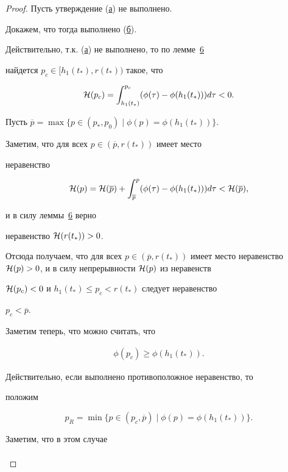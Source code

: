 \begin{proof} Пусть утверждение (\hyperlink{7a}{а}) не выполнено. 

Докажем, что тогда выполнено (\hyperlink{7b}{б}). 

Действительно, т.к. (\hyperlink{7a}{а}) не выполнено, то по лемме~\hyperlink{palin:lemma6}{6}

 найдется $p_c\in[h_1(t_*),r(t_*))$ такое, что

$$

{\cal H}(p_c)=\int _{h_1(t_*)}^{p_c}(\phi(\tau)-\phi(h_1(t_*)))d\tau<0.

$$



Пусть $\overline{p}=\max\{p\in(p_*,p_0)\mid\phi(p)=\phi(h_1(t_*))\}$.

Заметим, что для всех $p\in(\overline{p},r(t_*))$ имеет место

неравенство

$$

{\cal H}(p)={\cal

H}(\overline{p})+\int _{\overline{p}}^p(\phi(\tau)-\phi(h_1(t_*)))d\tau<{\cal

H}(\overline{p}),

$$

и в силу леммы~\hyperlink{palin:lemma6}{6} верно

неравенство ${\cal H}(r(t_*))>0$. 

Отсюда получаем, что для всех $p\in(\overline{p},r(t_*))$ имеет место неравенство ${\cal H}(p)>0$, и в силу непрерывности ${\cal H}(p)$ из неравенств

${\cal H}(p_c)<0$ и $h_1(t_*)\le p_c<r(t_*)$ следует неравенство

$p_c<\overline{p}$.



Заметим теперь, что можно считать, что

\begin{gather}

\phi(p_c)\ge\phi(h_1(t_*)).\label{eq-SupportiveForProof-correctnessexist-1}

\end{gather}

Действительно, если выполнено противоположное неравенство, то

положим

$$p_R=\min\{p\in(p_c,\overline{p})\mid\phi(p)=\phi(h_1(t_*))\}.$$

Заметим, что в этом случае

\begin{multline}


\end{multline}
\end{proof}
